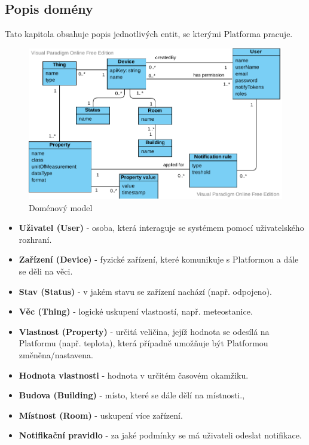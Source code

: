 \subsection{Popis domény} %
Tato kapitola obsahuje popis jednotlivých entit, se kterými Platforma pracuje.
\begin{figure}[htbp]
    \centering
    \includegraphics[width=\textwidth]{img/domain.pdf}
    \caption{  \label{domain-model}Doménový model}
\end{figure}
\begin{itemize}
    \item \textbf{Uživatel (User)} - osoba, která interaguje se systémem pomocí uživatelského rozhraní.
    \item \textbf{Zařízení (Device)} - fyzické zařízení, které komunikuje s Platformou a dále se děli na věci.
    \item \textbf{Stav (Status)} - v jakém stavu se zařízení nachází (např. odpojeno).
    \item \textbf{Věc (Thing)} - logické uskupení vlastností, např. meteostanice.
    \item \textbf{Vlastnost (Property)} - určitá veličina, jejíž hodnota se odesílá na Platformu (např. teplota), která případně umožňuje být Platformou změněna/nastavena.
    \item \textbf{Hodnota vlastnosti} - hodnota v určitém časovém okamžiku.
    \item \textbf{Budova (Building)} - místo, které se dále dělí na místnosti.,
    \item \textbf{Místnost (Room)} - uskupení více zařízení.
    \item \textbf{Notifikační pravidlo} - za jaké podmínky se má uživateli odeslat notifikace.
\end{itemize}


